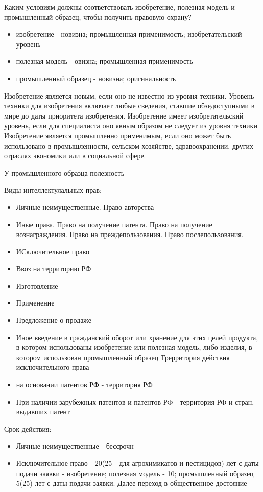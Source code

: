 \documentclass[12pt]{article}
\begin{document}
Каким условиям должны соответствовать изобретение, полезная модель и
промышленный образец, чтобы получить правовую охрану? 
\begin{itemize}
\item изобретение -
новизна; промышленная применимость; изобретательский уровень 
\item полезная
модель - овизна; промышленная применимость 
\item промышленный образец -
новизна; оригинальность
\end{itemize}

Изобретение является новым, если оно не известно из уровня техники.
Уровень техники для изобретения включает любые сведения, ставшие
обзедоступными в мире до даты приоритета изобретения. Изобретение имеет
изобретательский уровень, если для специалиста оно явным образом не
следует из уровня техники Изобретение является промышленно применимым,
если оно может быть использовано в промышленности, сельском хозяйстве,
здравоохранении, других отраслях экономики или в социальной сфере.

У промышленного образца полезность

Виды интеллектулальных прав: 
\begin{itemize}
  \item Личные неимущественные. Право авторства 
  \item Иные права. Право на получение патента. Право на получение
вознаграждения. Право на преждепользования. Право послепользования. 
\item ИСключительное право 
\item Ввоз на территорию РФ 
\item Изготовление 
\item Применение
\item Предложение о продаже 
\item Иное введение в гражданский оборот или
хранение для этих целей продукта, в котором использованы изобретение или
полезная модель, либо изделия, в котором использован промышленный
образец Трерритория действия исключительного права 
\item на основании патентов РФ - территория РФ 
\item При наличии зарубежных патентов и патентов
РФ - территория РФ и стран, выдавших патент
\end{itemize}

Срок действия:
\begin{itemize}
\item Личные неимущественные - бессрочн 
\item Исключительное право - 20(25 - для агрохимикатов и пестицидов) лет с даты подачи заявки -
изобретение; полезная модель - 10; промышленный образец 5(25) лет с даты
подачи заявки. Далее переход в общественное достояние
\end{itemize}
\end{document}
